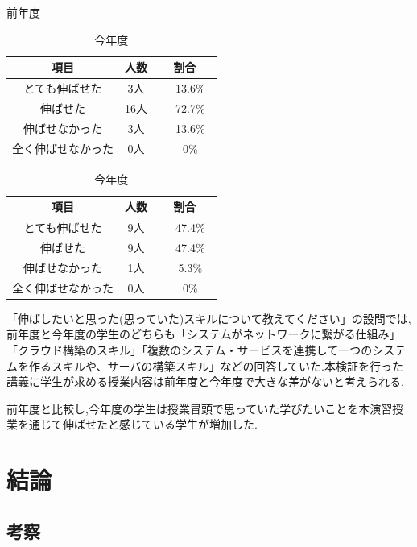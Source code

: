 \documentclass[11pt, a4paper]{jreport}
\begin{document}
\begin{table}[htbp]
  \begin{minipage}[c]{0.5\hsize}
        \caption{前年度}
        \label{tab:zennnenn_konnnenndo_hikaku}
        \centering
        \begin{tabular}{|c|c|c|} \hline
        項目 & 人数 & 割合\\ \hline
        とても伸ばせた & 3人 &　13.6\%　\\ \hline
        伸ばせた & 16人 &　72.7\%　\\ \hline
        伸ばせなかった & 3人 &　13.6\%　\\ \hline
        全く伸ばせなかった & 0人 &　0\%　\\ \hline
        \end{tabular}
    \end{minipage}
    \begin{minipage}[c]{0.5\hsize}
        \caption{今年度}
        \label{tab:zennnenn_konnnenndo_hikaku}
        \centering
        \begin{tabular}{|c|c|c|} \hline
        項目 & 人数 & 割合\\ \hline
        とても伸ばせた & 9人 &　47.4\%　\\ \hline
        伸ばせた & 9人 &　47.4\%　\\ \hline
        伸ばせなかった & 1人 &　5.3\%　\\ \hline
        全く伸ばせなかった & 0人 &　0\%　\\ \hline
        \end{tabular}
  \end{minipage}
\end{table}

「伸ばしたいと思った(思っていた)スキルについて教えてください」の設問では,前年度と今年度の学生のどちらも「システムがネットワークに繋がる仕組み」「クラウド構築のスキル」「複数のシステム・サービスを連携して一つのシステムを作るスキルや、サーバの構築スキル」などの回答していた.本検証を行った講義に学生が求める授業内容は前年度と今年度で大きな差がないと考えられる.

前年度と比較し,今年度の学生は授業冒頭で思っていた学びたいことを本演習授業を通じて伸ばせたと感じている学生が増加した.

\chapter{結論}

\section{考察}
\end{document}
